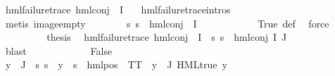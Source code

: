 \begin{isabellebody}
\ {\isachardoublequoteopen}hml{\isacharunderscore}{\kern0pt}failure{\isacharunderscore}{\kern0pt}trace\ {\isacharparenleft}{\kern0pt}hml{\isacharunderscore}{\kern0pt}conj\ {\isacharbraceleft}{\kern0pt}{\isacharbraceright}{\kern0pt}\ I\ {\isasymPsi}{\isacharparenright}{\kern0pt}{\isachardoublequoteclose}\ \isamarkupfalse%
\ hml{\isacharunderscore}{\kern0pt}failure{\isacharunderscore}{\kern0pt}trace{\isachardot}{\kern0pt}intros{\isacharparenleft}{\kern0pt}{}{\isacharparenright}{\kern0pt}\isanewline
\ \ \ \ \ \ \ \ \isamarkupfalse%
\ {\isacharparenleft}{\kern0pt}metis\ image{\isacharunderscore}{\kern0pt}empty{\isacharparenright}{\kern0pt}\isanewline
\ \ \ \ \ \ \isamarkupfalse%
\ {\isachardoublequoteopen}{\isasymforall}s{\isachardot}{\kern0pt}\ {\isacharparenleft}{\kern0pt}{\isasymnot}{\isacharparenleft}{\kern0pt}s\ {\isasymTurnstile}\ hml{\isacharunderscore}{\kern0pt}conj\ {\isacharbraceleft}{\kern0pt}{\isacharbraceright}{\kern0pt}\ I\ {\isasymPsi}{\isacharparenright}{\kern0pt}{\isacharparenright}{\kern0pt}{\isachardoublequoteclose}\ \isanewline
\ \ \ \ \ \ \ \ \isamarkupfalse%
\ True\ {\isasymPsi}{\isacharunderscore}{\kern0pt}def\ \isamarkupfalse%
\ force\isanewline
\ \ \ \ \ \ \isamarkupfalse%
\ \isamarkupfalse%
\ {\isacharquery}{\kern0pt}thesis\ \isamarkupfalse%
\ {\isacartoucheopen}hml{\isacharunderscore}{\kern0pt}failure{\isacharunderscore}{\kern0pt}trace\ {\isacharparenleft}{\kern0pt}hml{\isacharunderscore}{\kern0pt}conj\ {\isacharbraceleft}{\kern0pt}{\isacharbraceright}{\kern0pt}\ I\ {\isasymPsi}{\isacharparenright}{\kern0pt}{\isacartoucheclose}\ {\isacartoucheopen}{\isasymforall}s{\isachardot}{\kern0pt}\ {\isacharparenleft}{\kern0pt}{\isasymnot}{\isacharparenleft}{\kern0pt}s\ {\isasymTurnstile}\ hml{\isacharunderscore}{\kern0pt}conj\ I\ J\ {\isasymPhi}{\isacharparenright}{\kern0pt}{\isacharparenright}{\kern0pt}{\isacartoucheclose}\isanewline
\ \ \ \ \ \ \ \ \isamarkupfalse%
\ blast\isanewline
\ \ \ \ \isamarkupfalse%
\isanewline
\ \ \ \ \ \ \isamarkupfalse%
\ False\isanewline
\ \ \ \ \ \ \isamarkupfalse%
\ {\isachardoublequoteopen}{\isasymforall}y\ {\isasymin}\ {\isasymPhi}{\isacharbackquote}{\kern0pt}J{\isachardot}{\kern0pt}\ {\isasymexists}{\isasymalpha}{\isachardot}{\kern0pt}\ {\isacharparenleft}{\kern0pt}{\isasymforall}s{\isachardot}{\kern0pt}\ {\isacharparenleft}{\kern0pt}s\ {\isasymTurnstile}\ y{\isacharparenright}{\kern0pt}\ {\isasymlongleftrightarrow}\ {\isacharparenleft}{\kern0pt}s\ {\isasymTurnstile}\ {\isacharparenleft}{\kern0pt}hml{\isacharunderscore}{\kern0pt}pos\ {\isasymalpha}\ TT{\isacharparenright}{\kern0pt}{\isacharparenright}{\kern0pt}{\isacharparenright}{\kern0pt}{\isachardoublequoteclose}\ {\isacharbar}{\kern0pt}\ {\isachardoublequoteopen}{\isacharparenleft}{\kern0pt}{\isasymexists}y{\isasymin}{\isasymPhi}\ {\isacharbackquote}{\kern0pt}\ J{\isachardot}{\kern0pt}\ HML{\isacharunderscore}{\kern0pt}true\ y{\isacharparenright}{\kern0pt}{\isachardoublequoteclose}\isanewline

\end{isabellebody}
